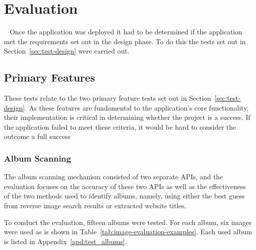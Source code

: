 \chapter{Evaluation}~\label{cha:evaluation}
Once the application was deployed it had to be determined if the application met the requirements set out in the design phase. To do this the tests set out in Section~\ref{sec:test-design} were carried out.

\section{Primary Features}
These tests relate to the two primary feature tests set out in Section~\ref{sec:test-design}. As these features are fundamental to the application's core functionality, their implementation is critical in determining whether the project is a success. If the application failed to meet these criteria, it would be hard to consider the outcome a full success

\subsection{Album Scanning}
The album scanning mechanism consisted of two separate APIs, and the evaluation focuses on the accuracy of these two APIs as well as the effectiveness of the two methods used to identify albums, namely, using either the best guess from reverse image search results or extracted website titles.

To conduct the evaluation, fifteen albums were tested. For each album, six images were used as is shown in Table~\ref{tab:image-evaluation-examples}.
\ifshowappendix
Each used album is listed in Appendix~\ref{apd:test_albums}.
\fi


